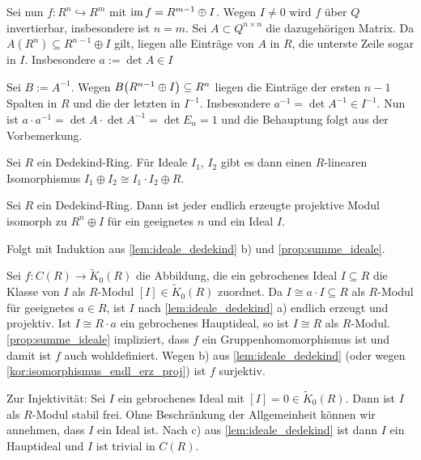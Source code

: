 \begin{beweis}
\begin{enumerate}[a)]
		Sei nun $f \colon R^n \hookrightarrow R^m$ mit $\operatorname{im} f = R^{m-1} \oplus I$.
		Wegen $I \neq 0$ wird $f$ über $Q$ invertierbar, insbesondere ist $n=m$.
		Sei $A \subset Q^{n \times n}$ die dazugehörigen Matrix.
		Da $A(R^n) \subseteq R^{n-1} \oplus I$ gilt, liegen alle Einträge von $A$ in $R$, die unterste Zeile sogar in $I$.
		Insbesondere $a := \det A \in I$
		
		Sei $B := A^{-1}$.
		Wegen $B \enbrace*{R^{n-1} \oplus I} \subseteq R^n$ liegen die Einträge der ersten $n-1$ Spalten in $R$ und die der letzten in $I^{-1}$.
		Insbesondere $a^{-1} = \det A^{-1} \in I^{-1}$.
		Nun ist $a \cdot a^{-1} = \det A \cdot \det A^{-1} = \det E_n =1$ und die Behauptung folgt aus der Vorbemerkung.\qedhere
	\end{enumerate}
\end{beweis}

\begin{proposition}[label=prop:summe_ideale]
	Sei $R$ ein Dedekind-Ring.
	Für Ideale $I_1$, $I_2$ gibt es dann einen $R$-linearen Isomorphismus $I_1 \oplus I_2 \cong I_1 \cdot I_2 \oplus R$.
\end{proposition}

\begin{korollar}[label=kor:isomorphismus_endl_erz_proj]
	Sei $R$ ein Dedekind-Ring.
	Dann ist jeder endlich erzeugte projektive Modul isomorph zu $R^n \oplus I$ für ein geeignetes $n$ und ein Ideal $I$.
\end{korollar}
\begin{beweis}
	Folgt mit Induktion aus \autoref{lem:ideale_dedekind} b) und \autoref{prop:summe_ideale}.
\end{beweis}

\begin{beweis}[name={von \autoref{satz:klassengruppe_K_0}}]
	Sei $f \colon C(R) \to \tilde{K}_0(R)$ die Abbildung, die ein gebrochenes Ideal $I \subseteq R$ die Klasse von $I$ als $R$-Modul $[I] \in \tilde{K}_0(R)$ zuordnet.
	Da $I\cong a \cdot I \subseteq R$ als $R$-Modul für geeignetes $a \in R$, ist $I$ nach \autoref{lem:ideale_dedekind} a) endlich erzeugt und projektiv.
	Ist $I \cong R \cdot a$ ein gebrochenes Hauptideal, so ist $I \cong R$ als $R$-Modul.
	\autoref{prop:summe_ideale} impliziert, dass $f$ ein Gruppenhomomorphismus ist und damit ist $f$ auch wohldefiniert.
	Wegen b) aus \autoref{lem:ideale_dedekind} (oder wegen \autoref{kor:isomorphismus_endl_erz_proj}) ist $f$ surjektiv.
	
	Zur Injektivität: Sei $I$ ein gebrochenes Ideal mit $[I]=0 \in \tilde{K}_0(R)$.
	Dann ist $I$ als $R$-Modul stabil frei.
	Ohne Beschränkung der Allgemeinheit können wir annehmen, dass $I$ ein Ideal ist.
	Nach c) aus \autoref{lem:ideale_dedekind} ist dann $I$ ein Hauptideal und $I$ ist trivial in $C(R)$.
\end{beweis}

